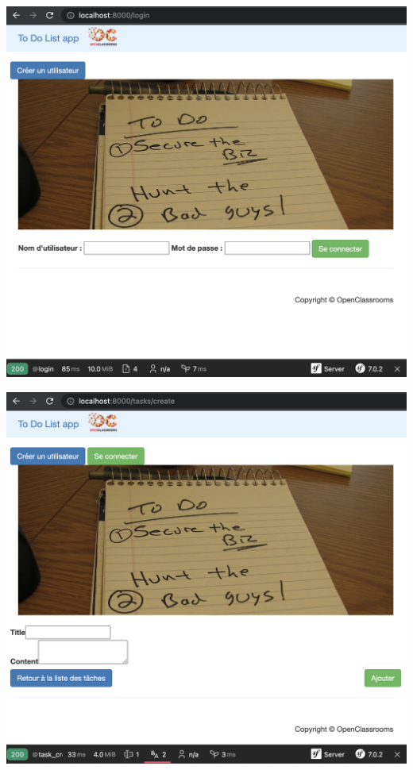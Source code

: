 \documentclass{article}
\theoremstyle{definition}
\theoremstyle{remark}
\begin{document}
\hspace*{2cm}

\includegraphics[scale=0.4]{Capture_profiler_avant_modif/Profiler_old_login.png}

\hspace*{2cm}

\includegraphics[scale=0.4]{Capture_profiler_avant_modif/Profiler_old_create_task.png}
\end{document}
